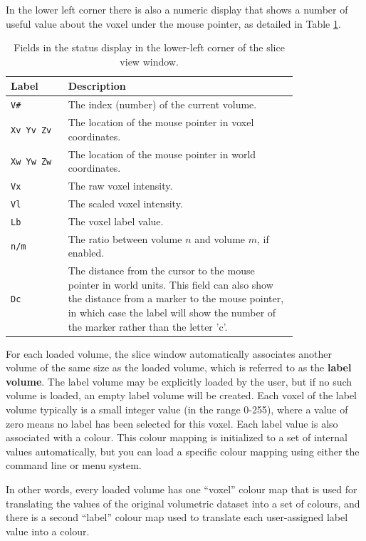 \documentclass[11pt,letterpaper]{article}
\newcommand{\ident}[1]{{\tt #1}}
\begin{document}
In the lower left corner there is also a numeric display that shows a
number of useful value about the voxel under the mouse pointer, as
detailed in Table \ref{tabSliceFields}.
\begin{table}
\centering
\caption{Fields in the status display in the lower-left corner of the slice view window.}
\begin{tabular}{lp{0.8\linewidth}}
Label & Description \\
\hline
\ident{V\#} & The index (number) of the current volume. \\
\ident{Xv Yv Zv} & The location of the mouse pointer in voxel coordinates. \\
\ident{Xw Yw Zw} & The location of the mouse pointer in world coordinates. \\
\ident{Vx} & The raw voxel intensity. \\
\ident{Vl} & The scaled voxel intensity. \\
\ident{Lb} & The voxel label value. \\
\ident{n/m} & The ratio between volume $n$ and volume $m$, if enabled. \\
\ident{Dc} & The distance from the cursor to the mouse pointer in world units. This field can also show the distance from a marker to the mouse pointer, in which case the label will show the number of the marker rather than the letter 'c'. \\
\hline
\end{tabular}
\label{tabSliceFields}
\end{table}

For each loaded volume, the slice window automatically associates
another volume of the same size as the loaded volume, which is
referred to as the {\bf label volume}. The label volume may be
explicitly loaded by the user, but if no such volume is loaded, an
empty label volume will be created. Each voxel of the label volume
typically is a small integer value (in the range 0-255), where a value
of zero means no label has been selected for this voxel. Each label
value is also associated with a colour. This colour mapping is
initialized to a set of internal values automatically, but you can
load a specific colour mapping using either the command line or menu
system.

In other words, every loaded volume has one ``voxel'' colour map that
is used for translating the values of the original volumetric dataset
into a set of colours, and there is a second ``label'' colour map used
to translate each user-assigned label value into a colour.
\end{document}
